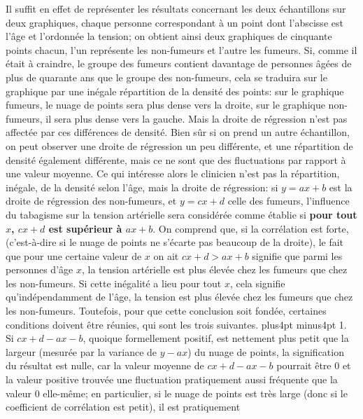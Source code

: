 Il suffit en effet de repr\'esenter les r\'esultats concernant les deux 
\'echan\-til\-lons sur deux graphiques, chaque personne correspondant
\`a un point dont l'abscisse est l'\^age et l'ordonn\'ee la tension; 
on obtient ainsi deux graphiques de cinquante points chacun,  l'un 
repr\'esente les non-fumeurs et l'autre les fumeurs. Si, comme il 
\'etait \`a craindre,  le groupe des fumeurs contient davantage de 
personnes \^ag\'ees de plus de quarante ans que le groupe des 
non-fumeurs, cela se traduira sur le graphique par une in\'egale 
r\'epartition de la densit\'e des points: sur le graphique fumeurs,  
le nuage de points sera plus dense vers la droite,  sur le graphique 
non-fumeurs, il sera plus dense vers la gauche. Mais la droite de 
r\'egression n'est pas affect\'ee par ces diff\'erences de densit\'e. 
Bien s\^ur si on prend un autre \'echantillon, on peut observer une 
droite de r\'egression un peu diff\'erente, et une r\'epartition de 
densit\'e \'egalement diff\'erente, mais ce ne sont que des fluctuations 
par rapport \`a une valeur moyenne. Ce qui int\'eresse alors le clinicien 
n'est pas la r\'epartition, in\'egale, de la densit\'e selon l'\^age, mais 
la droite de r\'egression: si $y = ax +b$ est la droite de r\'egression 
des non-fumeurs, et $y=cx + d$ celle des fumeurs, l'influence du 
tabagisme sur la tension art\'erielle sera consid\'er\'ee comme 
\'etablie si {\bf pour tout $x$, $cx + d$ est sup\'erieur \`a $ax + b$}. On 
comprend que, si la corr\'elation est forte, (c'est-\`a-dire si le nuage 
de points ne s'\'ecarte pas beaucoup de la droite), le fait que pour une 
certaine valeur de $x$ on ait $cx + d > ax + b$ signifie que parmi les 
personnes d'\^age $x$, la tension art\'erielle est plus \'elev\'ee chez 
les fumeurs que chez les non-fumeurs. Si cette in\'egalit\'e a lieu 
pour tout $x$, cela signifie qu'ind\'ependamment de l'\^age, la tension
est plus \'elev\'ee chez les fumeurs que chez les non-fumeurs. Toutefois, 
pour que cette conclusion soit fond\'ee, certaines conditions doivent 
\^etre r\'eunies, qui sont les trois suivantes. 
\vskip6pt plus4pt minus4pt 
1. Si $cx + d - ax - b$, quoique formellement positif, est nettement
plus petit que la largeur (mesur\'ee par la variance de $y - ax$) du 
nuage de points, la signification du r\'esultat est nulle, car la valeur 
moyenne de $cx + d - ax - b$ pourrait \^etre $0$ et la valeur positive 
trouv\'ee une fluctuation pratiquement aussi fr\'equente que la valeur 
$0$ elle-m\^eme; en particulier, si le nuage de points est tr\`es large 
(donc si le coefficient de corr\'elation est petit), il est pratiquement 
